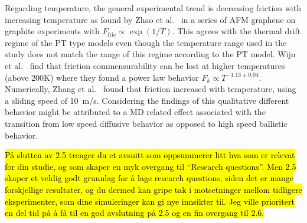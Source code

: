Regarding temperature, the general experimental trend is decreasing friction
with increasing temperature as found by Zhao et al.\ \cite{zhao_thermally_2007}
in a series of \acrshort{AFM} graphene on graphite experiments with
$F_{\text{fric}} \propto \exp{(1/T)}$. This agrees with the thermal drift regime
of the \acrshort{PT} type models even though the temperature range used in the
study does not match the range of this regime according to the \acrshort{PT}
model. Wijn et al.\ \cite{Wijn_2011} find that friction commensurability can be
lost at higher temperatures (above 200K) where they found a power law behavior
$F_k \propto T^{-1.13 \pm0.04}$. Numerically, Zhang et al.\ \cite{ma12091425}
found that friction increased with temperature, using a sliding speed of
\SI{10}{m/s}. Considering the findings of \cite{Guerra_2010} this qualitative different behavior might be attributed to a \acrshort{MD} related effect associated with the transition from low speed diffusive behavior as opposed to high speed ballistic behavior.


\hl{På slutten av 2.5 trenger du et avsnitt som oppsummerer litt hva som er relevat for din studie, og som skaper en myk overgang til ``Research questions''. Men 2.5 skaper et veldig godt grunnlag for å lage research questions, siden det er mange forskjellige resultater, og du dermed kan gripe tak i motsetninger mellom tidligere eksperimenter, som dine simuleringer kan gi nye innsikter til. Jeg ville prioritert en del tid på å få til en god avslutning på 2.5 og en fin overgang til 2.6.}





